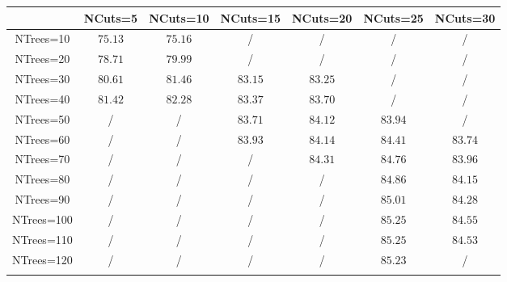 \centering
\begin{tabular}{ccccccc} \toprule\toprule
 & NCuts=5 & NCuts=10 & NCuts=15 & NCuts=20 & NCuts=25 & NCuts=30\\\midrule
NTrees=10 & $75.13$ & $75.16$ &  / &  / &  / &  /\\
NTrees=20 & $78.71$ & $79.99$ &  / &  / &  / &  /\\
NTrees=30 & $80.61$ & $81.46$ & $83.15$ & $83.25$ &  / &  /\\
NTrees=40 & $81.42$ & $82.28$ & $83.37$ & $83.70$ &  / &  /\\
NTrees=50 &  / &  / & $83.71$ & $84.12$ & $83.94$ &  /\\
NTrees=60 &  / &  / & $83.93$ & $84.14$ & $84.41$ & $83.74$\\
NTrees=70 &  / &  / &  / & $84.31$ & $84.76$ & $83.96$\\
NTrees=80 &  / &  / &  / &  / & $84.86$ & $84.15$\\
NTrees=90 &  / &  / &  / &  / & $85.01$ & $84.28$\\
NTrees=100 &  / &  / &  / &  / & $85.25$ & $84.55$\\
NTrees=110 &  / &  / &  / &  / & $85.25$ & $84.53$\\
NTrees=120 &  / &  / &  / &  / & $85.23$ &  /\\
\bottomrule\bottomrule\\
\end{tabular}
